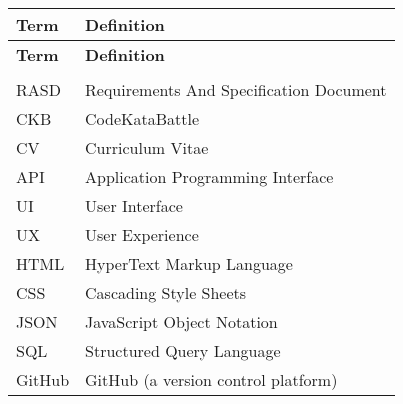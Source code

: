\begin{longtable}{@{} l p{} @{}}

\textbf{Term} & \textbf{Definition} \\
\hline
\endfirsthead

\textbf{Term} & \textbf{Definition} \\
\hline
\endhead

\\
RASD & Requirements And Specification Document \vspace{5mm} \\
CKB & CodeKataBattle \vspace{5mm} \\
CV & Curriculum Vitae \vspace{5mm} \\
API & Application Programming Interface \vspace{5mm} \\
UI & User Interface \vspace{5mm} \\
UX & User Experience \vspace{5mm} \\
HTML & HyperText Markup Language \vspace{5mm} \\
CSS & Cascading Style Sheets \vspace{5mm} \\
JSON & JavaScript Object Notation \vspace{5mm} \\
SQL & Structured Query Language \vspace{5mm} \\
GitHub & GitHub (a version control platform) \vspace{5mm} \\
\end{longtable}


\renewcommand{\arraystretch}{1.5} %

